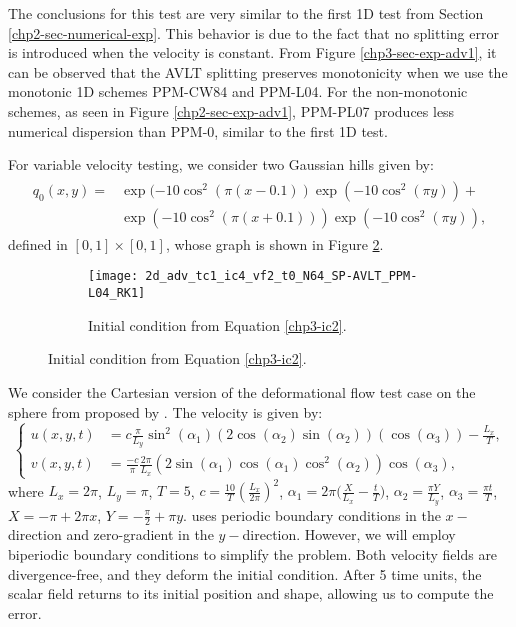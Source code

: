 The conclusions for this test are very similar to the first 1D test from Section \ref{chp2-sec-numerical-exp}.
This behavior is due to the fact that no splitting error is introduced when the velocity is constant.
From Figure \ref{chp3-sec-exp-adv1}, it can be observed that the AVLT splitting preserves monotonicity
when we use the monotonic 1D schemes PPM-CW84 and PPM-L04.
For the non-monotonic schemes, as seen in Figure \ref{chp2-sec-exp-adv1},
PPM-PL07 produces less numerical dispersion than PPM-0, similar to the first 1D test.

For variable velocity testing, we consider two Gaussian hills given by:
\begin{align}
	\begin{split}
	\label{chp3-ic2}
	q_0(x,y) = &\exp(-10\cos^2 (\pi (x-0.1))\exp(-10\cos^2 (\pi y)) + \\
			   &\exp(-10\cos^2 (\pi (x+0.1))) \exp(-10\cos^2 (\pi y)),
	\end{split}
\end{align}
defined in $[0,1] \times [0,1]$, whose graph is shown in Figure \ref{chp3-sec-exp-adv2-ic}.
\begin{figure}[!htb]
	\begin{subfigure}{0.45\textwidth}
		\centering
		\texttt{[image: 2d\_adv\_tc1\_ic4\_vf2\_t0\_N64\_SP-AVLT\_PPM-L04\_RK1]}
		\caption{Initial condition from Equation \eqref{chp3-ic2}.\label{chp3-sec-exp-adv2-ic}}
	\end{subfigure} 
\end{figure}

We consider the Cartesian version of the deformational flow test case on the sphere from \citet{nair:2010}
proposed by \citet{chen:2017}. The velocity is given by:
\begin{equation}
	\label{chp3-vf1}
	\begin{cases}
		u(x,y,t) &= c\frac{\pi}{L_y}\sin^2(\alpha_1)(2\cos(\alpha_2)\sin(\alpha_2))(\cos(\alpha_3)) - \frac{L_x}{T},\\
		v(x,y,t) &= \frac{-c}{\pi}\frac{2\pi}{L_x}(2\sin(\alpha_1)\cos(\alpha_1)\cos^2(\alpha_2))\cos(\alpha_3),
	\end{cases}
\end{equation}
where $L_x = 2\pi$, $L_y = \pi$, $T=5$, $c = \frac{10}{T}(\frac{L_x}{2\pi})^2$, $\alpha_1 = 2\pi\big(\frac{X}{L_x}-\frac{t}{T}\big)$, $\alpha_2 = \frac{\pi Y}{L_y}$,
$\alpha_3 =\frac{\pi t}{T}$,  $X = -\pi + 2\pi x $, $Y =-\frac{\pi}{2} +\pi y$. 
\citet{chen:2017} uses periodic boundary conditions in the $x-$direction and zero-gradient in the $y-$direction.
However, we will employ biperiodic boundary conditions to simplify the problem.
Both velocity fields are divergence-free, and they deform the initial condition.
After 5 time units, the scalar field returns to its initial position and shape, allowing us to compute the error.

